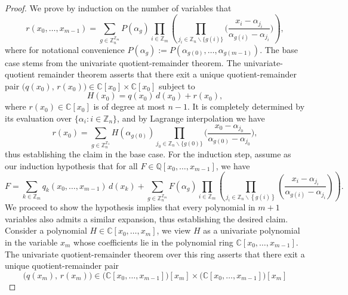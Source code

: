 \begin{proof}
We prove by induction on the number of variables that
\begin{equation}
r(x_{0},\ldots,x_{m-1})=\sum_{g\in\mathbb{Z}_{n}^{\mathbb{Z}_{m}}}P(\alpha_{g})\prod_{i\in\mathbb{Z}_{m}}\left(\prod_{j_{i}\in\mathbb{Z}_{n}\backslash\{g(i)\}}\bigg(\frac{x_{i}-\alpha_{j_{i}}}{\alpha_{g(i)}-\alpha_{j_{i}}}\bigg)\right),
\end{equation}
where for notational convenience $P(\alpha_{g}):=P(\alpha_{g(0)},\ldots,\alpha_{g(m-1)})$.
The base case stems from the univariate quotient-remainder theorem. The univariate-quotient remainder theorem asserts that there exit
a unique quotient-remainder pair $\big(q(x_{0}),\,r(x_{0})\big)\in\mathbb{C}[x_{0}]\times\mathbb{C}[x_{0}]$
subject to
\begin{equation}
H(x_{0})=q(x_{0})\,d(x_{0})+r(x_{0}),
\end{equation}
where $r(x_{0})\in\mathbb{C}[x_{0}]$ is of degree at most $n-1$.
It is completely determined by its evaluation over $\{\alpha_{i}:i\in\mathbb{Z}_{n}\}$,
and by Lagrange interpolation we have 
\begin{equation}
r(x_{0})=\sum_{g\in\mathbb{Z}_{n}^{\mathbb{Z}_{1}}}H(\alpha_{g(0)})\prod_{j_{0}\in\mathbb{Z}_{n}\backslash\{g(0)\}}\bigg(\frac{x_{0}-\alpha_{j_{0}}}{\alpha_{g(0)}-\alpha_{j_{0}}}\bigg),
\end{equation}
thus establishing the claim in the base case. For the induction step,
assume as our induction hypothesis that for all $F\in\mathbb{Q}\left[x_{0},\ldots,x_{m-1}\right]$,
we have
\begin{equation}
F=\sum_{k\in\mathbb{Z}_{m}}q_{k}(x_{0},\ldots,x_{m-1})\,d(x_{k})+\sum_{g\in\mathbb{Z}_{n}^{\mathbb{Z}_{m}}}F(\alpha_{g})\prod_{i\in\mathbb{Z}_{m}}\left(\prod_{j_{i}\in\mathbb{Z}_{n}\backslash\left\{ g(i)\right\} }\left(\frac{x_{i}-\alpha_{j_{i}}}{\alpha_{g(i)}-\alpha_{j_{i}}}\right)\right).
\end{equation}
We proceed to show the hypothesis implies that every polynomial in
$m+1$ variables also admits a similar expansion, thus establishing
the desired claim. Consider a polynomial $H \in \mathbb{C}[x_{0},\ldots,x_{m}]$, we view $H$ as a univariate polynomial in the variable $x_{m}$ whose coefficients lie in the polynomial ring $\mathbb{C}[x_{0},\ldots,x_{m-1}]$.
The univariate quotient-remainder theorem over this ring asserts that
there exit a unique quotient-remainder pair
\[
\big(q(x_{m}),\,r(x_{m})\big)\in\big(\mathbb{C}[x_{0},\ldots,x_{m-1}]\big)[x_{m}]\times\big(\mathbb{C}[x_{0},\ldots,x_{m-1}]\big)[x_{m}]
\]
\end{proof}
